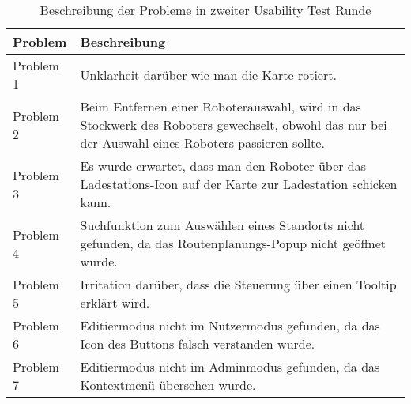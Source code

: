 \begin{table}[H]
    \caption{Beschreibung der Probleme in zweiter Usability Test Runde}\label{tbl:2ndUsabilityTestsProblemsDesc}
    \begin{tabular}{|l|l|} \hline
        Problem     & Beschreibung \\ \hline
        Problem 1   & \multicolumn{1}{p{12cm}|}{Unklarheit darüber wie man die Karte rotiert.} \\ \hline
        Problem 2   & \multicolumn{1}{p{12cm}|}{Beim Entfernen einer Roboterauswahl, wird in das Stockwerk des Roboters gewechselt, obwohl das nur bei der Auswahl eines Roboters passieren sollte.} \\ \hline
        Problem 3   & \multicolumn{1}{p{12cm}|}{Es wurde erwartet, dass man den Roboter über das Ladestations-Icon auf der Karte zur Ladestation schicken kann.} \\ \hline
        Problem 4   & \multicolumn{1}{p{12cm}|}{Suchfunktion zum Auswählen eines Standorts nicht gefunden, da das Routenplanungs-Popup nicht geöffnet wurde.} \\ \hline
        Problem 5   & \multicolumn{1}{p{12cm}|}{Irritation darüber, dass die Steuerung über einen Tooltip erklärt wird.} \\ \hline
        Problem 6   & \multicolumn{1}{p{12cm}|}{Editiermodus nicht im Nutzermodus gefunden, da das Icon des Buttons falsch verstanden wurde.} \\ \hline
        Problem 7   & \multicolumn{1}{p{12cm}|}{Editiermodus nicht im Adminmodus gefunden, da das Kontextmenü übersehen wurde.} \\ \hline
    \end{tabular}
\end{table}
